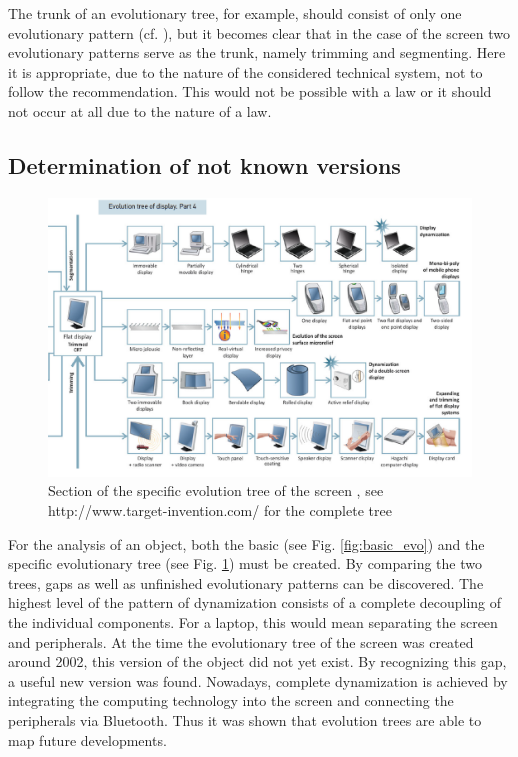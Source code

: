 \documentclass[11pt,a4paper]{article}
\begin{document}
The trunk of an evolutionary tree, for example, should consist of only one evolutionary pattern (cf. \cite[p. 122f]{Shpakovsky2016}), but it becomes clear that in the case of the screen two evolutionary patterns serve as the trunk, namely trimming and segmenting.
Here it is appropriate, due to the nature of the considered technical system, not to follow the recommendation. This would not be possible with a law or it should not occur at all due to the nature of a law.

\subsection{Determination of not known versions}

\begin{figure}[htb]
	\centering
	\includegraphics[width=0.9\linewidth]{figures/removable display.PNG}
	\caption{\small Section of the specific evolution tree of the screen \cite{Shpakovsky2016}, see http://www.target-invention.com/ for the complete tree}
	\label{fig:spec_evo}
\end{figure}


For the analysis of an object, both the basic (see Fig. \ref{fig:basic_evo}) and the specific evolutionary tree (see Fig. \ref{fig:spec_evo}) must be created. By comparing the two trees, gaps as well as unfinished evolutionary patterns can be discovered. The highest level of the pattern of dynamization consists of a complete decoupling of the individual components. For a laptop, this would mean separating the screen and peripherals. At the time the evolutionary tree of the screen was created around 2002, this version of the object did not yet exist. By recognizing this gap, a useful new version was found. Nowadays, complete dynamization is achieved by integrating the computing technology into the screen and connecting the peripherals via Bluetooth. Thus it was shown that evolution trees are able to map future developments.
\end{document}
